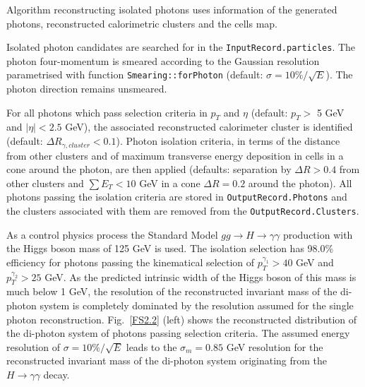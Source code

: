 Algorithm reconstructing isolated photons uses information
of the generated photons, reconstructed calorimetric clusters and
the cells map.
 
Isolated photon candidates are searched for in the 
{\tt  InputRecord.particles}. The photon four-momentum is
smeared according to the Gaussian resolution parametrised with
function {\tt Smearing::forPhoton} (default: $\sigma = 10\%/\sqrt{E}$).
The photon direction remains unsmeared.

For all photons which pass selection criteria in $p_T$ and $\eta$
(default: $p_T >$ 5 GeV and $|\eta| < 2.5$ GeV), the associated 
reconstructed  calorimeter cluster is identified (default: $\Delta
R_{\gamma, cluster} < 0.1$). Photon isolation criteria, in terms of
the distance from other clusters and of maximum transverse energy 
deposition in cells in a cone around the photon, are then applied
(defaults: separation by $\Delta R > 0.4$ from other clusters and
$\sum E_T < 10$ GeV in a cone  $\Delta R = 0.2$ around the photon).
All photons passing the isolation criteria are stored in 
{\tt OutputRecord.Photons} and the clusters associated with them are
removed from the {\tt OutputRecord.Clusters}. 

As a control physics process  the  Standard Model
$gg \to H \to \gamma \gamma$ production with the 
Higgs boson mass of 125 GeV is used. The 
isolation selection has 98.0\% efficiency for photons passing
the  kinematical selection of $p_T^{\gamma_1} > 40$ GeV and $p_T^{\gamma_2} > 25$ GeV.
As the predicted intrinsic width
of the Higgs boson of this mass is much below 1 GeV, the resolution 
of the reconstructed invariant mass of the di-photon system is
completely dominated by the resolution assumed for the 
single photon reconstruction. Fig.~\ref{FS2.2} (left) shows the
reconstructed distribution of the di-photon system of photons passing selection
criteria. The assumed energy resolution of $\sigma = 10\%/\sqrt{E}$
leads to the $\sigma_m = 0.85$ GeV resolution for the reconstructed
invariant mass of the di-photon system originating from the 
$ H \to \gamma \gamma$ decay.
 
